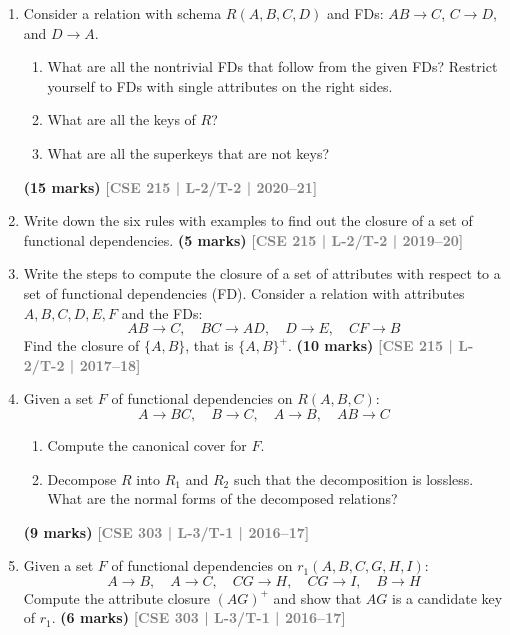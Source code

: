\documentclass[12pt,a3paper]{article}
\newcommand{\yr}[1]{\hfill\textcolor{gray}{\small\textbf{[#1]}}}
\newcommand{\mk}[1]{\textcolor{orange!70!black}{\small\textbf{(#1 marks)}}}
\begin{document}
\begin{enumerate}
\begin{enumerate}
\item Using the functional dependencies identified , decompose the relation into BCNF. Show your work and the final normalized schema including all keys.
\end{enumerate}
\mk{20} \yr{CSE 215 | L-2/T-2 | 2020--21}


\item Consider a relation with schema $R(A, B, C, D)$ and FDs: $AB \to C$, $C \to D$, and $D \to A$.
\begin{enumerate}
  \item What are all the nontrivial FDs that follow from the given FDs? Restrict yourself to FDs with single attributes on the right sides.
  \item What are all the keys of $R$?
  \item What are all the superkeys that are not keys?
\end{enumerate}
 \mk{15} \yr{CSE 215 | L-2/T-2 | 2020--21}

\item Write down the six rules with examples to find out the closure of a set of functional dependencies.
\mk{5} \yr{CSE 215 | L-2/T-2 | 2019--20}

\item Write the steps to compute the closure of a set of attributes with respect to a set of functional dependencies (FD). Consider a relation with attributes $A, B, C, D, E, F$ and the FDs:
\[AB \to C,\quad BC \to AD,\quad D \to E,\quad CF \to B\]
Find the closure of $\{A, B\}$, that is $\{A,B\}^+$.
\mk{10} \yr{CSE 215 | L-2/T-2 | 2017--18}

\item Given a set $F$ of functional dependencies on $R(A, B, C)$:
\[A \to BC,\quad B \to C,\quad A \to B,\quad AB \to C\]
\begin{enumerate}
  \item Compute the canonical cover for $F$.
  \item Decompose $R$ into $R_1$ and $R_2$ such that the decomposition is lossless. What are the normal forms of the decomposed relations?
\end{enumerate}
\mk{9} \yr{CSE 303 | L-3/T-1 | 2016--17}

\item Given a set $F$ of functional dependencies on $r_1(A, B, C, G, H, I)$:
\[A \to B,\quad A \to C,\quad CG \to H,\quad CG \to I,\quad B \to H\]
Compute the attribute closure $(AG)^+$ and show that $AG$ is a candidate key of $r_1$.
\mk{6} \yr{CSE 303 | L-3/T-1 | 2016--17}


\end{enumerate}
\end{document}
